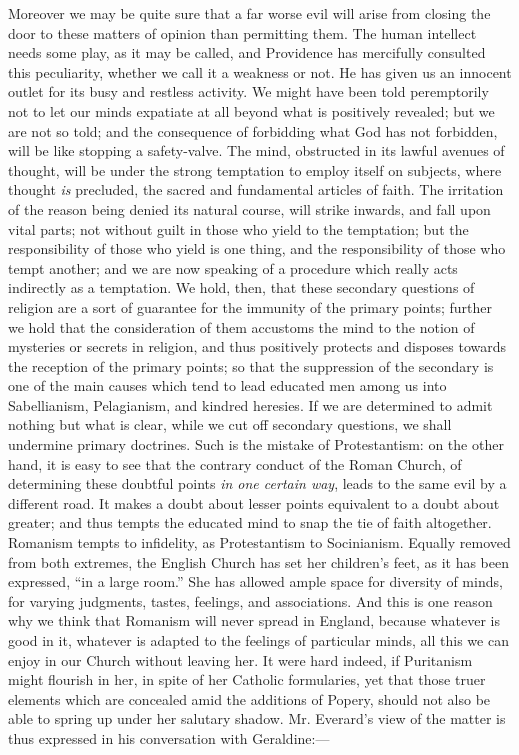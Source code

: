 Moreover we may be quite sure that a far worse evil
will arise from closing the door to these matters of opinion than
permitting them. The human intellect needs some play, as it may be
called, and Providence has mercifully consulted this peculiarity,
whether we call it a weakness or not. He has given us an innocent outlet
for its busy and restless activity. We might have been told peremptorily
not to let our minds expatiate at all beyond what is positively
revealed; but we are not so told; and the consequence of forbidding what
God has not forbidden, will be like stopping a safety-valve. The mind,
obstructed in its lawful avenues of thought, will be under the strong
temptation to employ itself on subjects, where thought \emph{is}
precluded, the sacred and fundamental articles of faith. The irritation
of the reason being denied its natural course, will strike inwards, and
fall upon vital parts; not without guilt in those who yield to the
temptation; but the responsibility of those who yield is one thing, and
the responsibility of those who tempt another; and we are now speaking
of a procedure which really acts indirectly as a temptation. We hold,
then, that these secondary questions of religion are a sort of guarantee
for the immunity of the primary points; further we hold that the
consideration of them accustoms the mind to the notion of mysteries or
secrets in religion, and thus positively protects and disposes towards
the reception of the primary points; so that the suppression of the
secondary is one of the main causes which tend to lead educated men
among us into Sabellianism, Pelagianism, and kindred heresies. If we are
determined to admit nothing but what is clear, while we cut off
secondary questions, we shall undermine primary doctrines. Such is the
mistake of Protestantism: on the other hand, it is easy to see that the
contrary conduct of the Roman Church, of determining these doubtful
points \emph{in one certain way}, leads to the same evil by a different
road. It makes a doubt about lesser points equivalent to a doubt about
greater; and thus tempts the educated mind to snap the tie of faith
altogether. Romanism tempts to infidelity, as Protestantism to
Socinianism. Equally removed from both extremes, the English Church has
set her children's feet, as it has been expressed, ``in a large room.''
She has allowed ample space for diversity of minds, for varying
judgments, tastes, feelings, and associations. And this is one reason
why we think that Romanism will never spread in England, because
whatever is good in it, whatever is adapted to the feelings of
particular minds, all this we can enjoy in our Church without leaving
her. It were hard indeed, if Puritanism might flourish in her, in
spite of her Catholic formularies, yet that those truer elements which
are concealed amid the additions of Popery, should not also be able to
spring up under her salutary shadow. Mr. Everard's view of the matter is
thus expressed in his conversation with Geraldine:—

